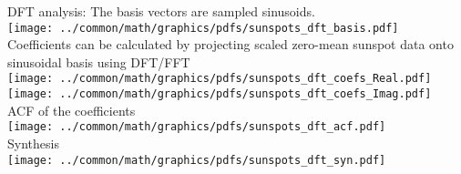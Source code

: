 \begin{example}
\label{ex:sunspot_period_DFT}
DFT analysis: The basis vectors are sampled sinusoids.
\\\texttt{[image: ../common/math/graphics/pdfs/sunspots\_dft\_basis.pdf]}
\\Coefficients can be calculated by projecting scaled zero-mean sunspot data onto sinusoidal basis using DFT/FFT
\\\texttt{[image: ../common/math/graphics/pdfs/sunspots\_dft\_coefs\_Real.pdf]}
\\\texttt{[image: ../common/math/graphics/pdfs/sunspots\_dft\_coefs\_Imag.pdf]}
\\ACF of the coefficients
\\\texttt{[image: ../common/math/graphics/pdfs/sunspots\_dft\_acf.pdf]}
\\Synthesis
\\\texttt{[image: ../common/math/graphics/pdfs/sunspots\_dft\_syn.pdf]}
\end{example}

